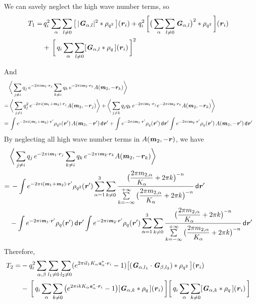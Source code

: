 \documentclass[aps,pre,preprint]{revtex4}
\renewcommand{\v}[1]{\textbf{\textit{#1}}}
\renewcommand{\d}[1]{\textsf{#1}}
\begin{document}
We can savely neglect the high wave number terms, so
\begin{align}\nonumber
  T_1
  = &\,
  q_i^2
  \sum_{\alpha} \sum_{l\neq 0}
  \big[\,
  \vert \v G_{\alpha,l}\vert^2
  \ast \rho_{q^2}
  \,\big] (\v r_i)
  +
  q_i^2\,
  \bigg[
  \big(
  \sum_{\alpha} \sum_{l\neq 0}  
  \v G_{\alpha,l}
  \big)^2
  \ast \rho_{q^2}\,
  \bigg] (\v r_i) \\
  &+ \,
  \bigg[\,
  q_i \sum_{\alpha}\sum_{l\neq 0}
  [\v G_{\alpha,l}\ast\rho_q\,] (\v r_i)
  \,\bigg]^2 
\end{align}

And 
\begin{align} \nonumber
  & \bigg\langle
  \sum_{j\neq i}q_j\,e^{-2\pi i\v m_1\cdot\v r_j}  
  \sum_{k\neq i}q_k\,e^{-2\pi i\v m_2\cdot\v r_k}A(\v m_2, -\v r_k)
  \bigg\rangle \\ \nonumber
  = &\,
  \bigg\langle
  \sum_{j\neq i}q^2_j\,e^{-2\pi i(\v m_1+\v m_2)\cdot\v r_j}A(\v m_2, -\v r_j) 
  \bigg\rangle
  +
  \bigg\langle
  \sum_{j\neq k}q_jq_k\,
  e^{-2\pi i\v m_1\cdot\v r_j}  
  e^{-2\pi i\v m_2\cdot\v r_k}A(\v m_2, -\v r_k)
  \bigg\rangle \\ \nonumber
  = &\,
  \int
  e^{-2\pi i (\v m_1 + \v m_2)\cdot\v r'}\rho_{q^2}(\v r')\,A(\v m_2,-\v r')\,\d d\v r' +
  \int
  e^{-2\pi i\v m_1\cdot\v r'}\rho_q(\v r')\,\d d\v r'
  \int
  e^{-2\pi i\v m_2\cdot\v r'}\rho_q(\v r')\,A(\v m_2,-\v r') \,\d d\v r'  
\end{align}
By neglecting all high wave number terms in $A(\v m_2,-\v r)$, we have
\begin{align}\nonumber
  & \bigg\langle
  \sum_{j\neq i}q_j\,e^{-2\pi i\v m_1\cdot\v r_j}  
  \sum_{k\neq i}q_k\,e^{-2\pi i\v m_2\cdot\v r_k}A(\v m_2, -\v r_k)
  \bigg\rangle \\ \nonumber
  = &\,
  -\int
  e^{-2\pi i (\v m_1 + \v m_2)\cdot\v r'}\rho_{q^2}(\v r')
  \sum_{\alpha=1}^3\sum_{k\neq 0}
  \frac
  {\big(\dfrac{2\pi m_{2,\alpha}}{K_\alpha} + 2\pi k\big)^{-n}}
  {\sum\limits_{k=-\infty}^{+\infty}
    \big(\dfrac{2\pi m_{2,\alpha}}{K_\alpha} + 2\pi k\big)^{-n}}
  \,\d d\v r' \\\nonumber
  &-
  \int
  e^{-2\pi i\v m_1\cdot\v r'}\rho_q(\v r')\,\d d\v r'
  \int
  e^{-2\pi i\v m_2\cdot\v r'}\rho_q(\v r')
  \sum_{\alpha=1}^3\sum_{k\neq 0}
  \frac
  {\big(\dfrac{2\pi m_{2,\alpha}}{K_\alpha} + 2\pi k\big)^{-n}}
  {\sum\limits_{k=-\infty}^{+\infty}
    \big(\dfrac{2\pi m_{2,\alpha}}{K_\alpha} + 2\pi k\big)^{-n}}
  \,\d d\v r'  
\end{align}
Therefore,
\begin{align}\nonumber
  T_2
  = &
  -q_i^2
  \sum_{\alpha,\beta} \sum_{l_1\neq 0}\sum_{l_2\neq 0}
  (e^{2\pi i l_1K_\alpha\v a^\ast_\alpha\cdot\v r_i} - 1)
  \big[
  (\v G_{\alpha,l_1}\cdot\v G_{\beta,l_2})\ast \rho_{q^2}\,
  \big] (\v r_i) \\
  &- \,
  \bigg[\,
  q_i \sum_{\alpha}\sum_{k\neq 0}
  \big(
  e^{2\pi ikK_\alpha\v a_\alpha^\ast\cdot\v r_i} - 1
  \big)
  [\v G_{\alpha,k}\ast\rho_q\,] (\v r_i)
  \,\bigg]  
  \bigg[\,
  q_i \sum_{\alpha}\sum_{k\neq 0}
  [\v G_{\alpha,k}\ast\rho_q\,] (\v r_i)
  \,\bigg]  
\end{align}
\end{document}
